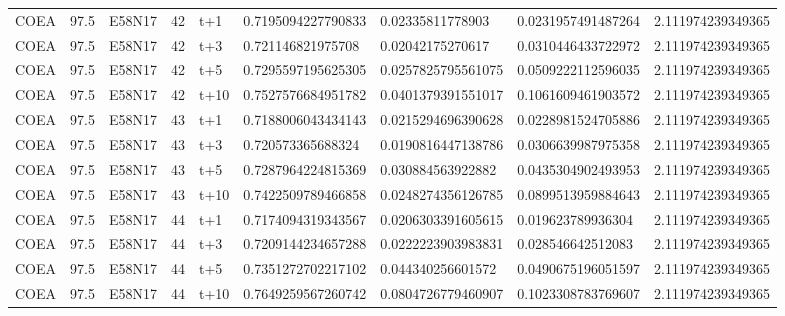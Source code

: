 \begin{landscape}
\begin{longtable}{lllllllll}
COEA & 97.5 & E58N17 & 42 & t+1 & 0.7195094227790833 & 0.02335811778903 & 0.0231957491487264 & 2.111974239349365 \\
COEA & 97.5 & E58N17 & 42 & t+3 & 0.721146821975708 & 0.02042175270617 & 0.0310446433722972 & 2.111974239349365 \\
COEA & 97.5 & E58N17 & 42 & t+5 & 0.7295597195625305 & 0.0257825795561075 & 0.0509222112596035 & 2.111974239349365 \\
COEA & 97.5 & E58N17 & 42 & t+10 & 0.7527576684951782 & 0.0401379391551017 & 0.1061609461903572 & 2.111974239349365 \\
COEA & 97.5 & E58N17 & 43 & t+1 & 0.7188006043434143 & 0.0215294696390628 & 0.0228981524705886 & 2.111974239349365 \\
COEA & 97.5 & E58N17 & 43 & t+3 & 0.720573365688324 & 0.0190816447138786 & 0.0306639987975358 & 2.111974239349365 \\
COEA & 97.5 & E58N17 & 43 & t+5 & 0.7287964224815369 & 0.030884563922882 & 0.0435304902493953 & 2.111974239349365 \\
COEA & 97.5 & E58N17 & 43 & t+10 & 0.7422509789466858 & 0.0248274356126785 & 0.0899513959884643 & 2.111974239349365 \\
COEA & 97.5 & E58N17 & 44 & t+1 & 0.7174094319343567 & 0.0206303391605615 & 0.019623789936304 & 2.111974239349365 \\
COEA & 97.5 & E58N17 & 44 & t+3 & 0.7209144234657288 & 0.0222223903983831 & 0.028546642512083 & 2.111974239349365 \\
COEA & 97.5 & E58N17 & 44 & t+5 & 0.7351272702217102 & 0.044340256601572 & 0.0490675196051597 & 2.111974239349365 \\
COEA & 97.5 & E58N17 & 44 & t+10 & 0.7649259567260742 & 0.0804726779460907 & 0.1023308783769607 & 2.111974239349365 \\
\bottomrule
\end{longtable}
\end{landscape}
